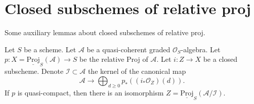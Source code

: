 \section{Closed subschemes of relative proj}
\label{section-closed-in-relative-proj}

\noindent
Some auxiliary lemmas about closed subschemes of relative proj.

\begin{lemma}
\label{lemma-closed-subscheme-proj}
Let $S$ be a scheme. Let $\mathcal{A}$ be a quasi-coherent graded
$\mathcal{O}_S$-algebra. Let
$p : X = \underline{\text{Proj}}_S(\mathcal{A}) \to S$ be the relative
Proj of $\mathcal{A}$. Let $i : Z \to X$ be a closed subscheme. Denote
$\mathcal{I} \subset \mathcal{A}$ the kernel of the canonical map
$$
\mathcal{A}
\longrightarrow
\bigoplus\nolimits_{d \geq 0} p_*\left((i_*\mathcal{O}_Z)(d)\right).
$$
If $p$ is quasi-compact, then there is an isomorphism
$Z = \underline{\text{Proj}}_S(\mathcal{A}/\mathcal{I})$.
\end{lemma}

